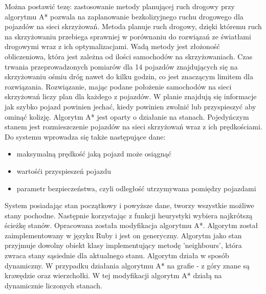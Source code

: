 Można postawić tezę: zastosowanie metody planującej ruch drogowy przy algorytmu A* pozwala na zaplanowanie bezkolizyjnego ruchu drogowego dla pojazdów na sieci skrzyżowań. Metoda planuje ruch drogowy, dzięki któremu ruch na skrzyżowaniu przebiega sprawniej w porównaniu do rozwiązań ze światłami drogowymi wraz z ich optymalizacjami. Wadą metody jest złożoność obliczeniowa, która jest zależna od ilości samochodów na skrzyżowaniach. Czas trwania przeprowadzonych pomiarów dla 14 pojazdów znajdujących się na skrzyżowaniu ośmiu dróg nawet do kilku godzin, co jest znaczącym limitem dla rozwiązania.
\newline
\newline
Rozwiązanie, mając podane położenie samochodów na sieci skrzyżowań liczy plan dla każdego z pojazdów. W planie znajdują się informacje jak szybko pojazd powinien jechać, kiedy powinien zwolnić lub przyspieszyć aby ominąć kolizję.
\newline
\newline
Algorytm A* jest oparty o działanie na stanach. Pojedyńczym stanem jest rozmieszczenie pojazdów na sieci skrzyżowań wraz z ich prędkościami.
\newline
\newline
Do systemu wprowadza się także następujące dane:
\begin{itemize}
\item maksymalną prędkość jaką pojazd może osiągnąć
\item wartośći przyspieszeń pojazdu
\item parametr bezpieczeństwa, czyli odległość utrzymywana pomiędzy pojazdami
\end{itemize}
System posiadając stan początkowy i powyższe dane, tworzy wszystkie możliwe stany pochodne. Następnie korzystając z funkcji heurystyki wybiera najkrótszą ścieżkę stanów.
\newline
\newline
Opracowana została modyfikacja algorytmu A*. Algorytm został zaimplementowany w języku Ruby i jest on generyczny. Algorytm jako stan przyjmuje dowolny obiekt klasy implementujący metodę 'neighbours', która zwraca stany sąsiednie dla aktualnego stanu.
\newline
\newline
Algorytm działa w sposób dynamiczny. W przypadku działania algorytmu A* na grafie - z góry znane są krawędzie oraz wierzchołki. W tej modyfikacji algorytm A* działą na dynamicznie liczonych stanach.
\newline
\newline
